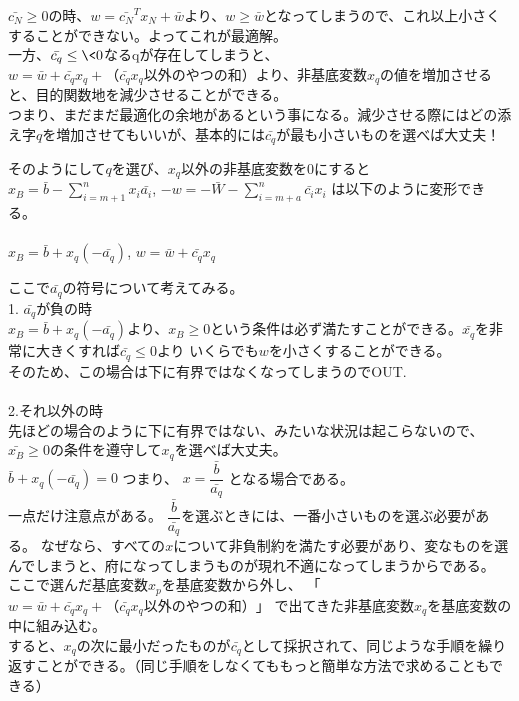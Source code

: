 \documentclass[platex,dvipdfmx]{jlreq}			%
\begin{document}
$\bar{c_N} \geq 0$の時、$w = \bar{c_N}^{T} x_N +  \bar{w}$より、$w \geq \bar{w}$となってしまうので、これ以上小さくすることができない。よってこれが最適解。\\


一方、$\bar{c_q} \leq \< 0$なるqが存在してしまうと、$w = \bar{w} + \bar{c_q} x_q +（\bar{c_q} x_q以外のやつの和）$より、非基底変数$x_q$の値を増加させると、目的関数地を減少させることができる。\\
つまり、まだまだ最適化の余地があるという事になる。減少させる際にはどの添え字$q$を増加させてもいいが、基本的には$\bar{c_q}$が最も小さいものを選べば大丈夫！

そのようにして$q$を選び、$x_q$以外の非基底変数を0にすると
$x_B = \bar{b}-\sum\limits_{i=m+1}^n x_i \bar{a_i} $, \quad
$-w =  - \bar{W} -\sum\limits_{i=m+a}^n  \bar{c_i} x_i $
は以下のように変形できる。\\\\

\large
$x_B = \bar{b} + x_q (-\bar{a_q}) $, \quad
$w = \bar{w} + \bar{c_q} x_q$
\normalsize

ここで$\bar{a_q}$の符号について考えてみる。\\
1. $\bar{a_q}$が負の時\\
$x_B = \bar{b} + x_q (-\bar{a_q}) $より、$x_B \geq 0$という条件は必ず満たすことができる。$\bar{x_q}$を非常に大きくすれば$\bar{c_q} \leq 0$より
いくらでも$w$を小さくすることができる。\\
そのため、この場合は下に有界ではなくなってしまうのでOUT.\\
\noindent \\
2.それ以外の時\\
先ほどの場合のように下に有界ではない、みたいな状況は起こらないので、$\bar{x_B} \geq 0$の条件を遵守して$x_q$を選べば大丈夫。\\
$\bar{b} + x_q (-\bar{a_q}) =0 $
つまり、
$x = \dfrac{\bar{b}}{\bar{a_q}}$
となる場合である。\\
一点だけ注意点がある。
$\dfrac{\bar{b}}{\bar{a_q}}$を選ぶときには、一番小さいものを選ぶ必要がある。
なぜなら、すべての$x$について非負制約を満たす必要があり、変なものを選んでしまうと、府になってしまうものが現れ不適になってしまうからである。\\
ここで選んだ基底変数$x_p$を基底変数から外し、
「$w = \bar{w} + \bar{c_q} x_q +（\bar{c_q} x_q以外のやつの和）$」
で出てきた非基底変数$x_q$を基底変数の中に組み込む。\\
すると、$x_q$の次に最小だったものが$\bar{c_q}$として採択されて、同じような手順を繰り返すことができる。（同じ手順をしなくてももっと簡単な方法で求めることもできる）
\end{document}
